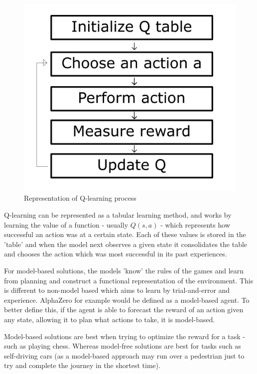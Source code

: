 \documentclass{article}
\begin{document}
    \begin{figure}
        \centering
        \includegraphics[scale=0.4]{qlearning.PNG}
        \caption{Representation of Q-learning process}
    \end{figure}
    Q-learning can be represented as a tabular learning method, and works by learning the value of a function - usually $Q(s, a)$ - which represents how successful an action was at
    a certain state. Each of these values is stored in the 'table' and when the model next observes a given state it consolidates the table and chooses the action which was most
    successful in its past experiences.

    For model-based solutions, the models 'know' the rules of the games and learn from planning and construct a functional representation of the environment. This is different to non-model
    based which aims to learn by trial-and-error and experience. AlphaZero for example would be defined as a model-based agent. To better define this, if the agent is able to forecast the reward
    of an action given any state, allowing it to plan what actions to take, it is model-based.

    Model-based solutions are best when trying to optimize the reward for a task - such as playing chess. Whereas model-free solutions are best for tasks such as self-driving cars (as a model-based
    approach may run over a pedestrian just to try and complete the journey in the shortest time).
\end{document}

